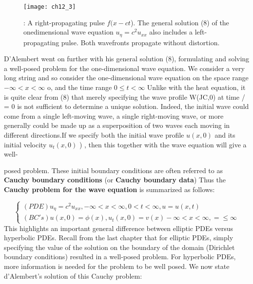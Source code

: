 \documentclass[../main.tex]{subfiles}
\begin{document}
\begin{figure}[H]
	\centering
	\texttt{[image: ch12\_3]}
	\caption{\textsf{: A right-propagating pulse $f(x - ct$). The general solution (8) of the onedimensional wave equation $u_\eta = c^2 u_{xx}$
also includes a left-propagating pulse. Both
wavefronts propagate without distortion.}}
	\label{pfig:ch12_3}
\end{figure}

D'Alembert went on further with his general solution (8), formulating and
solving a well-posed problem for the one-dimensional wave equation. We
consider a very long string and so consider the one-dimensional wave equation on
the space range $ -\infty <x< \infty$ o, and the time range $ 0 \leqslant t < \infty $ 
Unlike with the heat
equation, it is quite clear from (8) that merely specifying the wave profile W(JC,0) at
time / = 0 is not sufficient to determine a unique solution. Indeed, the initial wave
could come from a single left-moving wave, a single right-moving wave, or more
generally could be made up as a superposition of two waves each moving in
different directions.If we specify both the initial wave profile $u(x,0)$ and its
initial velocity $u_t(x,0)$ ) , then this together with the wave equation will give a well-


posed problem. These initial boundary conditions are often referred to as \textbf{Cauchy
boundary conditions}  (or \textbf{Cauchy boundary data}) Thus the \textbf{Cauchy problem
for the wave equation} is summarized as follows: 

\begin{equation} \label{eqa9}
\left\{\begin{array}{ll}
(PDE) u_\eta=c^2u_{xx}, -\infty<x<\infty, 0<t<\infty, u=u(x,t)\\
(BC's) u(x,0)=\phi(x), u_t(x,0)=v(x)-\infty<x<\infty ,=\leqslant \infty
\end{array} \right.
\end{equation}
This highlights an important general difference between elliptic PDEs versus
hyperbolic PDEs. Recall from the last chapter that for elliptic PDEs, simply
specifying the value of the solution on the boundary of the domain (Dirichlet
boundary conditions) resulted in a well-posed problem. For hyperbolic PDEs,
more information is needed for the problem to be well posed. We now state
d'Alembert's solution of this Cauchy problem: 
\\
\\
\end{document}
